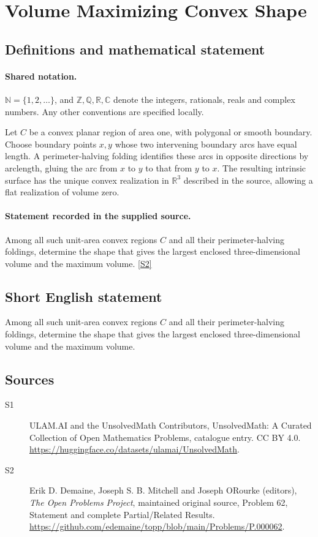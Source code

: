 \documentclass[11pt]{article}
\newcommand{\sref}[2]{\hyperlink{source:#1:#2}{[S#2]}}
\begin{document}
\section{Volume Maximizing Convex Shape}\label{statement}

\subsection{Definitions and mathematical statement}

\paragraph{Shared notation.}$\mathbb N=\{1,2,\ldots\}$, and $\mathbb Z,\mathbb Q,\mathbb R,\mathbb C$ denote the integers, rationals, reals and complex numbers. Any other conventions are specified locally.


Let $C$ be a convex planar region of area one, with polygonal or smooth boundary. Choose boundary points $x,y$ whose two intervening boundary arcs have equal length. A perimeter-halving folding identifies these arcs in opposite directions by arclength, gluing the arc from $x$ to $y$ to that from $y$ to $x$. The resulting intrinsic surface has the unique convex realization in $\mathbb R^3$ described in the source, allowing a flat realization of volume zero.
\paragraph{Statement recorded in the supplied source.}
Among all such unit-area convex regions $C$ and all their perimeter-halving foldings, determine the shape that gives the largest enclosed three-dimensional volume and the maximum volume. \sref{statement}{2}
\subsection{Short English statement}
Among all such unit-area convex regions $C$ and all their perimeter-halving foldings, determine the shape that gives the largest enclosed three-dimensional volume and the maximum volume.
\subsection{Sources}
\begin{description}
\item[\hypertarget{source:statement:1}{S1}] ULAM.AI and the UnsolvedMath Contributors, UnsolvedMath: A Curated Collection of Open Mathematics Problems, catalogue entry. CC BY 4.0. \url{https://huggingface.co/datasets/ulamai/UnsolvedMath}.
\item[\hypertarget{source:statement:2}{S2}] Erik D. Demaine, Joseph S. B. Mitchell and Joseph O\textquotesingle Rourke (editors), \emph{The Open Problems Project}, maintained original source, Problem 62, Statement and complete Partial/Related Results. \url{https://github.com/edemaine/topp/blob/main/Problems/P.000062}.
\end{description}
\label{end:statement}
\end{document}
